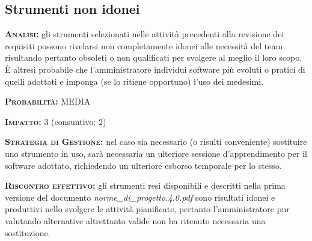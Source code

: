 \subsection{Strumenti non idonei}
\begin{description}
	\item{\scshape\bfseries Analisi:} gli strumenti selezionati nelle attività precedenti alla revisione dei requisiti possono rivelarsi non completamente idonei alle necessità del team risultando pertanto obsoleti o non qualificati per svolgere al meglio il loro scopo. È altresì probabile che l'amministratore individui software più evoluti o pratici di quelli adottati e imponga (se lo ritiene opportuno) l'uso dei medesimi.
	\item{\scshape\bfseries Probabilità:} MEDIA
	\item{\scshape\bfseries Impatto:} 3 (consuntivo: 2)
	\item{\scshape\bfseries Strategia di Gestione:} nel caso sia necessario (o risulti conveniente) sostituire uno strumento in uso, sarà necessaria un ulteriore sessione d'apprendimento per il software adottato, richiedendo un ulteriore esborso temporale per lo stesso.
	\item{\scshape\bfseries Riscontro effettivo:} gli strumenti resi disponibili e descritti nella prima versione del documento \textit{norme\_di\_progetto.4.0.pdf} sono risultati idonei e produttivi nello svolgere le attività pianificate, pertanto l'amministratore pur valutando alternative altrettanto valide non ha ritenuto necessaria una sostituzione.
\end{description}


